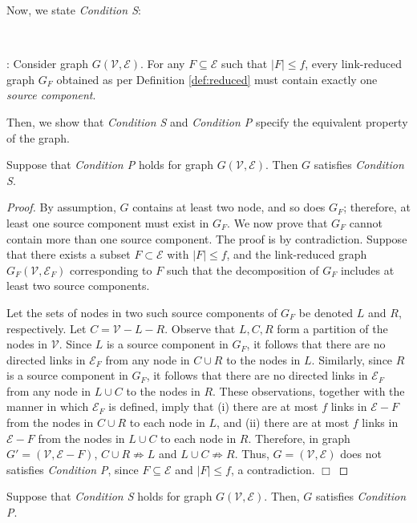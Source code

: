 \documentclass{llncs}
\newcommand{\fillbox}{\hspace*{\fill}\(\Box\)}
\newcommand{\scripte}{\mathcal{E}}
\newcommand{\scriptv}{\mathcal{V}}
\begin{document}
Now, we state {\em Condition S}:

~

: Consider graph $G(\scriptv,\scripte)$. For any $F \subseteq \scripte$ such that $|F| \leq f$, every
link-reduced graph $G_F$ obtained as per Definition \ref{def:reduced} 
must contain exactly one {\em source component}.


Then, we show that {\em Condition S} and {\em Condition P} specify the equivalent property of the graph.

\begin{lemma}
\label{lemma:p-to-s}
Suppose that {\em Condition P} holds for graph $G(\scriptv,\scripte)$. Then $G$ satisfies {\em Condition S}.

\end{lemma}

\begin{proof}
By assumption, 
$G$ contains at least two node, and so does $G_F$;
therefore, at least one
source component must exist in $G_F$. We now prove that $G_F$ cannot
contain more than one source component. The proof is by contradiction.
Suppose that there exists a subset $F\subset \scripte$ with $|F|\leq f$,
and the link-reduced graph 
$G_F(\scriptv,\scripte_F)$ corresponding to $F$ such
that the decomposition of $G_F$ includes at least two source components.

Let the sets of nodes in two such source components of $G_F$
be denoted $L$ and $R$, respectively. Let $C=\scriptv-L-R$.
Observe that $L,C,R$ form a partition of the nodes in $\scriptv$.
Since $L$ is a source component in $G_F$, it follows that
there are no directed links in $\scripte_F$ from any node in
$C\cup R$ to the nodes in $L$.
Similarly, since $R$ is a source component in $G_F$, it follows that
there are no directed links in $\scripte_F$ from any node in $L\cup C$ to
the nodes in $R$.
These observations, together with the manner in which $\scripte_F$
is defined, imply that (i) there are at most $f$ links in $\scripte - F$ from
the nodes in $C\cup R$ to each node in $L$, and
(ii) there are at most $f$ links in $\scripte - F$ from
the nodes in $L\cup C$ to each node in $R$.
Therefore, in graph $G' = (\scriptv,\scripte-F)$, $C\cup R\not\Rightarrow L$ and $L\cup C\not\Rightarrow R$. Thus, $G = (\scriptv, \scripte)$ does not satisfies {\em Condition P}, since $F \subseteq \scripte$ and $|F| \leq f$, a contradiction.
\fillbox
\end{proof}

\begin{lemma}
\label{lemma:s-to-p}
Suppose that {\em Condition S} holds for graph $G(\scriptv,\scripte)$.
Then, $G$ satisfies {\em Condition P}.
\end{lemma}
\end{document}
